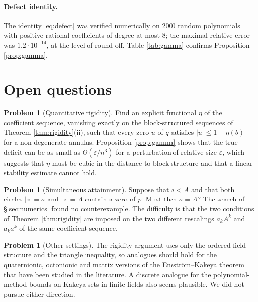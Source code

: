 \documentclass[11pt]{amsart}
\theoremstyle{plain}
\theoremstyle{definition}
\newtheorem{problem}[theorem]{Problem}
\theoremstyle{remark}
\newcommand{\abs}[1]{\lvert #1\rvert}
\begin{document}
\paragraph{Defect identity.} The identity \eqref{eq:defect} was verified numerically on
$2000$ random polynomials with positive rational coefficients of degree at most $8$; the
maximal relative error was $1.2\cdot10^{-14}$, at the level of round-off. Table
\ref{tab:gamma} confirms Proposition \ref{prop:gamma}.

\section{Open questions}\label{sec:open}

\begin{problem}[Quantitative rigidity]\label{prob:quant}
Find an explicit functional $\eta$ of the coefficient sequence, vanishing exactly on the
block-structured sequences of Theorem \ref{thm:rigidity}(ii), such that every zero $u$ of
$q$ satisfies $\abs{u}\le1-\eta(b)$ for a non-degenerate annulus. Proposition
\ref{prop:gamma} shows that the true deficit can be as small as $\Theta(\varepsilon/n^{3})$
for a perturbation of relative size $\varepsilon$, which suggests that $\eta$ must be cubic
in the distance to block structure and that a linear stability estimate cannot hold.
\end{problem}

\begin{problem}[Simultaneous attainment]\label{prob:both}
Suppose that $a<A$ and that both circles $\abs{z}=a$ and $\abs{z}=A$ contain a zero of $p$.
Must then $a=A$? The search of \S\ref{sec:numerics} found no counterexample. The difficulty
is that the two conditions of Theorem \ref{thm:rigidity} are imposed on the two different
rescalings $a_kA^{k}$ and $a_ka^{k}$ of the same coefficient sequence.
\end{problem}

\begin{problem}[Other settings]\label{prob:other}
The rigidity argument uses only the ordered field structure and the triangle inequality, so
analogues should hold for the quaternionic, octonionic and matrix versions of the
Enestr\"om--Kakeya theorem that have been studied in the literature. A discrete analogue for
the polynomial-method bounds on Kakeya sets in finite fields also seems plausible. We did
not pursue either direction.
\end{problem}
\end{document}
